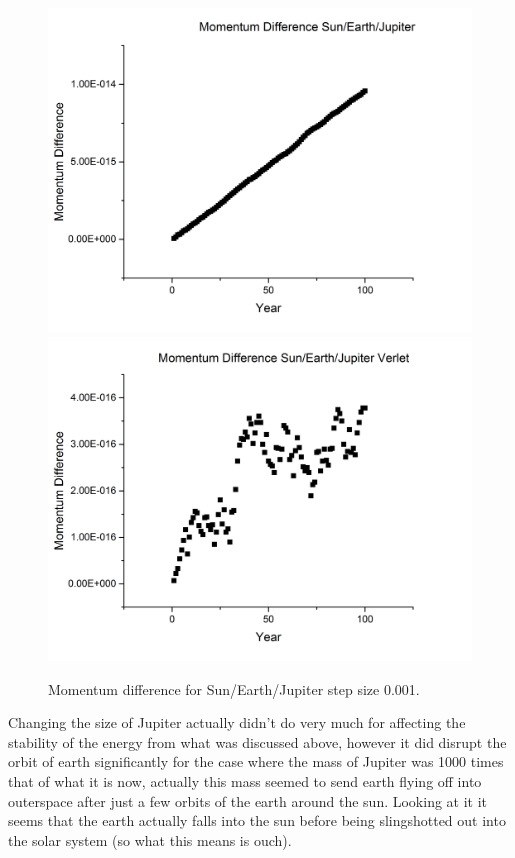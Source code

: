 \documentclass[12pt,righttag]{article}
\begin{document}
			\begin{figure}
	\includegraphics[scale=0.25]{Graph13.png}
	\includegraphics[scale=0.25]{Graph12.png}
		\caption{\label{Stability3} Momentum difference for Sun/Earth/Jupiter step size 0.001. }	
\end{figure}
	Changing the size of Jupiter actually didn't do very much for affecting the stability of the energy from what was discussed above, however it did disrupt the orbit of earth significantly for the case where the mass of Jupiter was 1000 times that of what it is now, actually this mass seemed to send earth flying off into outerspace after just a few orbits of the earth around the sun. Looking at it it seems that the earth actually falls into the sun before being slingshotted out into the solar system (so what this means is ouch).
	
\end{document}
